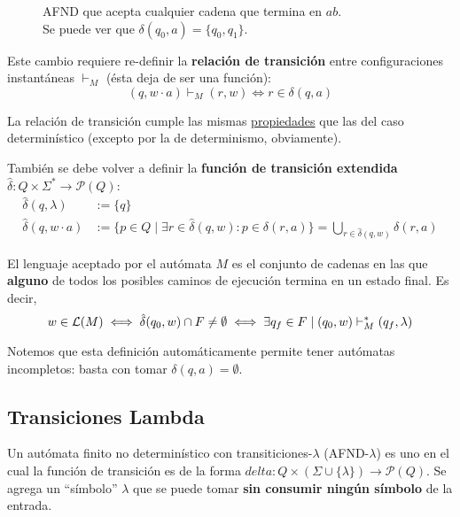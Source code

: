 \begin{figure}[H]
    \centering
    \caption*{AFND que acepta cualquier cadena que termina en $ab$. \\ Se puede ver que $\delta(q_0, a) = \{q_0, q_1\}$.}
\end{figure}

Este cambio requiere re-definir la \textbf{relación de transición} entre configuraciones instantáneas $\vdash_M$ (ésta deja de ser una función):
$$
(q, w \cdot a) \vdash_M (r, w) \iff r \in \delta(q, a)
$$

La relación de transición cumple las mismas \hyperref[subsubsec-propiedades-rel-transicion]{propiedades} que las del caso determinístico (excepto por la de determinismo, obviamente).

También se debe volver a definir la \textbf{función de transición extendida} $\hat \delta : Q \times \Sigma^* \to \mathcal P (Q)$:
$$
\begin{aligned}
    \hat \delta(q, \lambda) & := \{q\} \\
    \hat \delta(q, w \cdot a) & := \{p \in Q \mid \exists r \in \hat \delta (q, w) : p \in \delta (r, a)\} = \bigcup_{r \in \hat \delta(q, w)} \delta(r, a)
\end{aligned}
$$

El lenguaje aceptado por el autómata $M$ es el conjunto de cadenas en las que \textbf{alguno} de todos los posibles caminos de ejecución termina en un estado final. Es decir,
$$
w \in \mathcal{L}(M) \iff \hat \delta(q_0, w) \cap F \neq \emptyset \iff \exists q_f \in F \mid (q_0, w) \vdash_M^* (q_f, \lambda)
$$

Notemos que esta definición automáticamente permite tener autómatas incompletos: basta con tomar $\delta(q, a) = \emptyset$.

\subsection{Transiciones Lambda}

Un autómata finito no determinístico con transiticiones-$\lambda$ (AFND-$\lambda$) es uno en el cual la función de transición es de la forma $delta : Q \times (\Sigma \cup \{\lambda\}) \to \mathcal P (Q)$. Se agrega un ``símbolo'' $\lambda$ que se puede tomar \textbf{sin consumir ningún símbolo} de la entrada.

